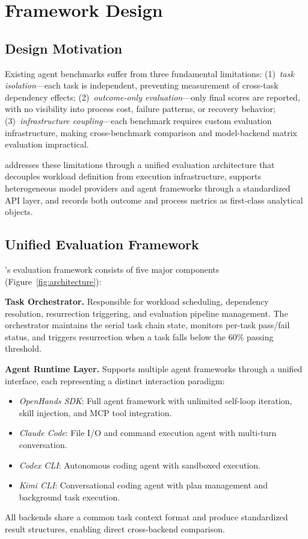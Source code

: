 \section{Framework Design}

\subsection{Design Motivation}

Existing agent benchmarks suffer from three fundamental limitations: (1)~\emph{task isolation}---each task is independent, preventing measurement of cross-task dependency effects; (2)~\emph{outcome-only evaluation}---only final scores are reported, with no visibility into process cost, failure patterns, or recovery behavior; (3)~\emph{infrastructure coupling}---each benchmark requires custom evaluation infrastructure, making cross-benchmark comparison and model-backend matrix evaluation impractical.

\eva{} addresses these limitations through a unified evaluation architecture that decouples workload definition from execution infrastructure, supports heterogeneous model providers and agent frameworks through a standardized API layer, and records both outcome and process metrics as first-class analytical objects.

\subsection{Unified Evaluation Framework}

\eva{}'s evaluation framework consists of five major components (Figure~\ref{fig:architecture}):

\textbf{Task Orchestrator.}
Responsible for workload scheduling, dependency resolution, resurrection triggering, and evaluation pipeline management.
The orchestrator maintains the serial task chain state, monitors per-task pass/fail status, and triggers resurrection when a task falls below the 60\% passing threshold.

\textbf{Agent Runtime Layer.}
Supports multiple agent frameworks through a unified interface, each representing a distinct interaction paradigm:
\begin{itemize}[nosep]
\item \emph{OpenHands SDK}: Full agent framework with unlimited self-loop iteration, skill injection, and MCP tool integration.
\item \emph{Claude Code}: File I/O and command execution agent with multi-turn conversation.
\item \emph{Codex CLI}: Autonomous coding agent with sandboxed execution.
\item \emph{Kimi CLI}: Conversational coding agent with plan management and background task execution.
\end{itemize}
All backends share a common task context format and produce standardized result structures, enabling direct cross-backend comparison.

